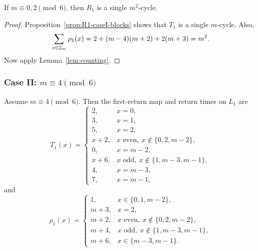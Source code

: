 \begin{corollary}\label{cor:R1-caseI}
If $m\equiv 0,2\pmod 6$, then $R_1$ is a single $m^2$-cycle.
\end{corollary}

\begin{proof}
Proposition~\ref{prop:R1-caseI-blocks} shows that $T_1$ is a single $m$-cycle.
Also,
\[
\sum_{x\in \mathbb Z_m}\rho_1(x)=2+(m-4)(m+2)+2(m+3)=m^2.
\]
Now apply Lemma~\ref{lem:counting}.
\end{proof}

\subsubsection{Case II: $m\equiv 4\pmod 6$}

\begin{proposition}\label{prop:R1-caseII}
Assume $m\equiv 4\pmod 6$.
Then the first-return map and return times on $L_1$ are
\[
T_1(x)=
\begin{cases}
2,&x=0,\\
3,&x=1,\\
5,&x=2,\\
x+2,&x\text{ even},\ x\notin\{0,2,m-2\},\\
0,&x=m-2,\\
x+6,&x\text{ odd},\ x\notin\{1,m-3,m-1\},\\
4,&x=m-3,\\
7,&x=m-1,
\end{cases}
\]
and
\[
\rho_1(x)=
\begin{cases}
1,&x\in\{0,1,m-2\},\\
m+3,&x=2,\\
m+2,&x\text{ even},\ x\notin\{0,2,m-2\},\\
m+4,&x\text{ odd},\ x\notin\{1,m-3,m-1\},\\
m+6,&x\in\{m-3,m-1\}.
\end{cases}
\]
\end{proposition}

